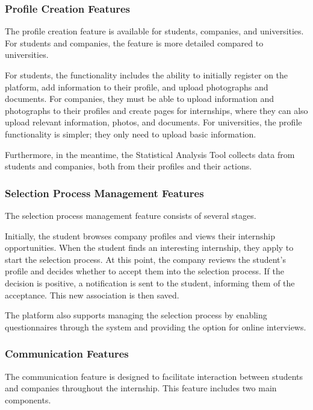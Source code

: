 \subsubsection{Profile Creation Features}

The profile creation feature is available for students, companies, and universities.
For students and companies, the feature is more detailed compared to universities. 

For students, the functionality includes the ability to initially register on the
platform, add information to their profile, and upload photographs and documents.  
For companies, they must be able to upload information and photographs to their
profiles and create pages for internships, where they can also upload relevant information,
photos, and documents.  
For universities, the profile functionality is simpler; they only need to upload basic information.

Furthermore, in the meantime, the Statistical Analysis Tool collects data
from students and companies, both from their profiles and their actions.

\subsubsection{Selection Process Management Features}

The selection process management feature consists of several stages.

Initially,
the student browses company profiles and views their internship opportunities. When the student
finds an interesting internship, they apply to start the selection process. At this point, the
company reviews the student's profile and decides whether to accept them into the selection process.
If the decision is positive, a notification is sent to the student, informing them of the acceptance.
This new association is then saved.

The platform also supports managing the selection process by enabling questionnaires through the
system and providing the option for online interviews.

\subsubsection{Communication Features}

The communication feature is designed to facilitate interaction between students and companies
throughout the internship. This feature includes two main components.

